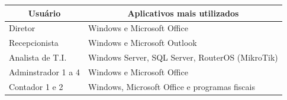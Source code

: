 \documentclass[	DIV=calc,%
							paper=a4,%
							fontsize=12pt,%
							onecolumn]{scrartcl}	 					%
\begin{document}

\begin{table}[H]
	\centering
	\renewcommand{\arraystretch}{2.0}
	\begin{tabular}{|l|l|}
		\hline
		\multicolumn{1}{|c|}{\textbf{Usuário}} &	 \multicolumn{1}{|c|}{\textbf{Aplicativos mais utilizados}}                                 		  \\ \hline		Diretor                                
		& Windows e Microsoft Office                                              \\ \hline
		Recepcionista                               
		& Windows e Microsoft Outlook            					\\ \hline
		Analista de T.I.                                  
		& Windows Server, SQL Server, RouterOS (MikroTik)          \\ \hline
		Adminstrador 1 a 4 
		& Windows e Microsoft Office         \\ \hline
		Contador 1 e 2                                  
		& Windows, Microsoft Office e programas fiscais    \\ \hline
	\end{tabular}
\end{table}

\end{document}
